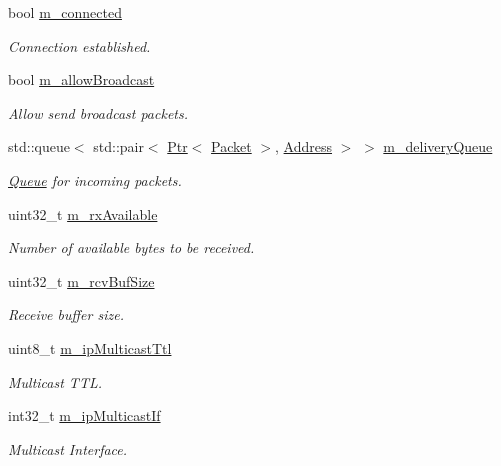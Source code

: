 \begin{DoxyCompactItemize}
bool \hyperlink{classns3_1_1UdpSocketImpl_a2df1a2df7ba0f4c852ad1d2155b1fbcc}{m\+\_\+connected}
\begin{DoxyCompactList}\small\item\em Connection established. \end{DoxyCompactList}\item 
bool \hyperlink{classns3_1_1UdpSocketImpl_a071404252802565f1d1511b5c98b155a}{m\+\_\+allow\+Broadcast}
\begin{DoxyCompactList}\small\item\em Allow send broadcast packets. \end{DoxyCompactList}\item 
std\+::queue$<$ std\+::pair$<$ \hyperlink{classns3_1_1Ptr}{Ptr}$<$ \hyperlink{classns3_1_1Packet}{Packet} $>$, \hyperlink{classns3_1_1Address}{Address} $>$ $>$ \hyperlink{classns3_1_1UdpSocketImpl_a6a95636f11b186eab1f70727500d9233}{m\+\_\+delivery\+Queue}
\begin{DoxyCompactList}\small\item\em \hyperlink{classns3_1_1Queue}{Queue} for incoming packets. \end{DoxyCompactList}\item 
uint32\+\_\+t \hyperlink{classns3_1_1UdpSocketImpl_a73e12067139eb298bbb4b0e2c2e56a6a}{m\+\_\+rx\+Available}
\begin{DoxyCompactList}\small\item\em Number of available bytes to be received. \end{DoxyCompactList}\item 
uint32\+\_\+t \hyperlink{classns3_1_1UdpSocketImpl_a81c69f998616d1d79a9c81c569b725e9}{m\+\_\+rcv\+Buf\+Size}
\begin{DoxyCompactList}\small\item\em Receive buffer size. \end{DoxyCompactList}\item 
uint8\+\_\+t \hyperlink{classns3_1_1UdpSocketImpl_a4849465356cef8573ed373d12a5a62ec}{m\+\_\+ip\+Multicast\+Ttl}
\begin{DoxyCompactList}\small\item\em Multicast T\+TL. \end{DoxyCompactList}\item 
int32\+\_\+t \hyperlink{classns3_1_1UdpSocketImpl_a4ff1b1c6db56fad154afe2563d985e08}{m\+\_\+ip\+Multicast\+If}
\begin{DoxyCompactList}\small\item\em Multicast Interface. \end{DoxyCompactList}\item 

\end{DoxyCompactItemize}
